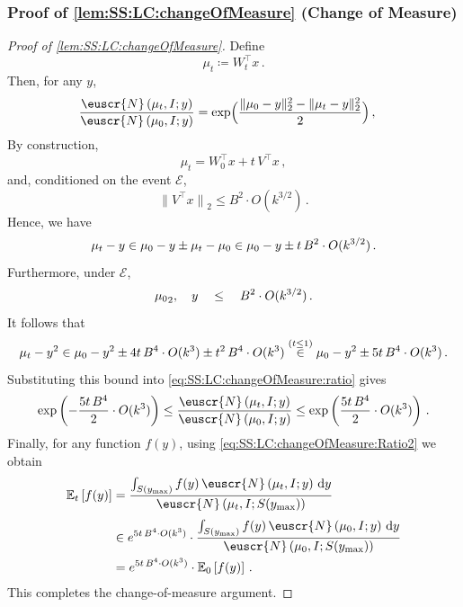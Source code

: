 \documentclass[11pt,letterpaper]{article}
\theoremstyle{plain}
\theoremstyle{definition}
\theoremstyle{remark}
\newcommand{\sinparen}[1]{\ensuremath{(#1)}}
\newcommand{\inparen}[1]{\ensuremath{\left(#1\right)}}
\newcommand{\insquare}[1]{\ensuremath{\left[#1\right]}}
\newcommand{\snorm}[1]{\ensuremath{\ensuremath{\| #1 \|}}}
\let\norm\relax
\newcommand{\norm}[1]{\ensuremath{\left\lVert #1 \right\rVert}}
\newcommand{\evE}{\ensuremath{\mathscr{E}}}
\newcommand{\E}{\operatornamewithlimits{\mathbb{E}}}
\newcommand{\Ex}{\E}
\newcommand{\customcal}[1]{\euscr{#1}}
\newcommand{\cN}{\customcal{N}}
\renewcommand{\d}{{\rm d}}
\newcommand{\normalMass}[3]{\cN\inparen{#1, #2; #3}}
\newcommand{\ymax}{y_{\max}}
\begin{document}
{{\subsubsection{Proof of \cref{lem:SS:LC:changeOfMeasure} (Change of Measure)}  
\label{sec:proofof:lem:SS:LC:changeOfMeasure}
    \begin{proof}[Proof of \cref{lem:SS:LC:changeOfMeasure}]
        Define 
        \[
        \mu_t \coloneqq W_t^\top x\,.
        \]
        Then, for any $y$, 
        \begin{align}
        \frac{\normalMass{\mu_t}{I}{y}}{\normalMass{\mu_0}{I}{y}}
          &= \exp\Bigl(\frac{\|\mu_0-y\|_2^2 - \|\mu_t-y\|_2^2}{2}\Bigr)
          \,,
          \label{eq:SS:LC:changeOfMeasure:ratio}
        \end{align} 
        By construction, 
        \[
        \mu_t = W_0^\top x + t\,V^\top x\,,
        \]
        and, conditioned on the event $\evE$, 
        \[
        \snorm{V^\top x}_2 \le B^2\cdot O\sinparen{k^{3/2}}\,.
        \]
        Hence, we have
        \[
        \norm{\mu_t-y} \in \norm{\mu_0-y} \pm \norm{\mu_t-\mu_0} \in \norm{\mu_0-y} \pm t\,B^2\cdot O\sinparen{k^{3/2}}\,.
        \]
        Furthermore, under $\evE$, 
        \[
        \norm{\mu_0}_2,~~~ \norm{y} ~~~\le~~~ B^2\cdot O\sinparen{k^{3/2}}\,.
        \]
        It follows that
        \[
        \norm{\mu_t-y}^2 \in \norm{\mu_0-y}^2 
        \pm 4t\,B^4\cdot O(k^3)
        \pm t^2\,B^4\cdot O(k^3)
        \overset{(t\le 1)}{\in} \norm{\mu_0-y}^2 \pm 5t\,B^4\cdot O(k^3)\,.
        \]
        Substituting this bound into \cref{eq:SS:LC:changeOfMeasure:ratio} gives
        \begin{align}
        \exp\inparen{-\frac{5t\,B^4}{2}\cdot O(k^3)}
        \le \frac{\normalMass{\mu_t}{I}{y}}{\normalMass{\mu_0}{I}{y}}
        \le \exp\inparen{\frac{5t\,B^4}{2}\cdot O(k^3)}\,.
        \label{eq:SS:LC:changeOfMeasure:Ratio2}
        \end{align} 
        Finally, for any function $f(y)$, using \cref{eq:SS:LC:changeOfMeasure:Ratio2} we obtain
        \begin{align*}
        \Ex\nolimits_t\insquare{f(y)}
          &= \frac{\int_{S(\ymax)} f(y)\,\normalMass{\mu_t}{I}{y}\,\d y}{\normalMass{\mu_t}{I}{S(\ymax)}}\\[1mm]
          &\in e^{5t\,B^4\cdot O(k^3)}\cdot \frac{\int_{S(\ymax)} f(y)\,\normalMass{\mu_0}{I}{y}\,\d y}{\normalMass{\mu_0}{I}{S(\ymax)}}\\
          &= e^{5t\,B^4\cdot O(k^3)}\cdot \Ex\nolimits_0\insquare{f(y)}\,.
        \end{align*}
        This completes the change-of-measure argument.
    \end{proof} 
     

}}
\end{document}
